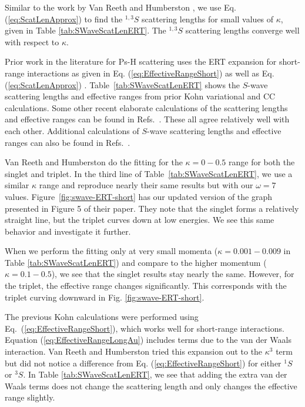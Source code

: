 \documentclass[preprint,showpacs,showkeys,preprintnumbers,amsmath,amssymb,longbibliography,pra,aps]{revtex4-1}
\begin{document}
Similar to the work by Van Reeth and Humberston \cite{VanReeth2003}, we use 
Eq. (\ref{eq:ScatLenApprox}) to find the $^{1,3}S$ scattering lengths for small 
values of $\kappa$, given in Table \ref{tab:SWaveScatLenERT}. The $^{1,3}S$
scattering lengths converge well with respect to $\kappa$.

Prior work in the literature for Ps-H scattering
\cite{Blackwood2002,Ivanov2002,Walters2004,VanReeth2003}
uses the ERT expansion for short-range 
interactions as given in Eq. (\ref{eq:EffectiveRangeShort})
as well as Eq. (\ref{eq:ScatLenApprox}) \cite{VanReeth2003}.
Table~\ref{tab:SWaveScatLenERT}
shows the $S$-wave scattering lengths and effective
ranges from prior Kohn variational \cite{VanReeth2003} and CC
\cite{Blackwood2002,Walters2004} calculations. Some other recent elaborate
calculations of the scattering lengths and effective ranges can be found in
Refs.~\cite{Sinha2000,Ivanov2001,Chiesa2002,Ivanov2002}.
These all agree relatively well with each 
other. Additional calculations of $S$-wave scattering lengths and effective 
ranges can also be found in
Refs.~\cite{Hara1975,Page1976,Drachman1975,
Drachman1976,Campbell1998,Adhikari1999,Adhikari2001b}.

Van Reeth and Humberston \cite{VanReeth2003} do the fitting for the
$\kappa = 0-0.5$ range for both the singlet and triplet. In the third line of
Table~\ref{tab:SWaveScatLenERT}, we use a similar $\kappa$ range and reproduce
nearly their same results but with our $\omega = 7$ values.
Figure~\ref{fig:swave-ERT-short} has our updated version of the graph
presented in Figure 5 of their paper. They note that the singlet forms a
relatively straight line, but the triplet curves down at low energies. We see
this same behavior and investigate it further.

When we perform the fitting only at very small momenta
($\kappa = 0.001 - 0.009$ in
Table \ref{tab:SWaveScatLenERT}) and compare to the higher momentum
($\kappa = 0.1 - 0.5$), we see that the singlet results stay nearly the same. 
However, for the triplet, the effective range changes significantly. This 
corresponds with the triplet curving downward in
Fig. \ref{fig:swave-ERT-short}.

The previous Kohn calculations \cite{VanReeth2003} were performed using
Eq.~(\ref{eq:EffectiveRangeShort}), which works well for short-range
interactions. Equation (\ref{eq:EffectiveRangeLongAu}) includes terms due
to the van der Waals interaction. Van Reeth and Humberston \cite{VanReeth2003}
tried this expansion out to the $\kappa^3$ term but did not notice a
difference from Eq. (\ref{eq:EffectiveRangeShort}) for either $^1S$ or $^3S$.
In Table \ref{tab:SWaveScatLenERT}, we see that adding the extra van der
Waals terms does not change the scattering length and only changes the
effective range slightly.
\end{document}
